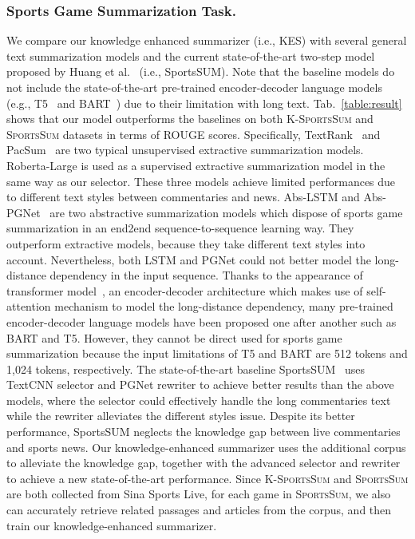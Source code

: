 \subsubsection{Sports Game Summarization Task.}
We compare our knowledge enhanced summarizer (i.e., KES) with several general text summarization models and the current state-of-the-art two-step model proposed by Huang et al.~\cite{Huang2020GeneratingSN} (i.e., SportsSUM). 
Note that the baseline models do not include the state-of-the-art pre-trained encoder-decoder language models (e.g., T5~\cite{Raffel2020ExploringTL} and BART~\cite{Lewis2020BARTDS}) due to their limitation with long text.
Tab.~\ref{table:result} shows that our model outperforms the baselines on both \textsc{K-SportsSum} and \textsc{SportsSum} datasets in terms of ROUGE scores.
Specifically, TextRank~\cite{Mihalcea2004TextRankBO} and PacSum~\cite{zheng-lapata-2019-sentence} are two typical unsupervised extractive summarization models. Roberta-Large is used as a supervised  extractive summarization model in the same way as our selector. These three models achieve limited performances due to different text styles between commentaries and news. Abs-LSTM and Abs-PGNet~\cite{See2017GetTT} are two abstractive summarization models which dispose of sports game summarization in an end2end sequence-to-sequence learning way. They outperform extractive models, because they take different text styles into account. Nevertheless, both LSTM and PGNet could not better model the long-distance dependency in the input sequence. Thanks to the appearance of transformer model~\cite{Vaswani2017AttentionIA}, an encoder-decoder architecture which makes use of self-attention mechanism to model the long-distance dependency, many pre-trained encoder-decoder language models have been proposed one after another such as BART and T5. However, they cannot be direct used for sports game summarization because the input limitations of T5 and BART are 512 tokens and 1,024 tokens, respectively.
The state-of-the-art baseline SportsSUM~\cite{Huang2020GeneratingSN} uses TextCNN selector and PGNet rewriter to achieve better results than the above models, where the selector could effectively handle the long commentaries text while the rewriter alleviates the different styles issue.
Despite its better performance, SportsSUM neglects the knowledge gap between live commentaries and sports news.
Our knowledge-enhanced summarizer uses the additional corpus to alleviate the knowledge gap, together with the advanced selector and rewriter to achieve a new state-of-the-art performance. Since \textsc{K-SportsSum} and \textsc{SportsSum} are both collected from Sina Sports Live, for each game in \textsc{SportsSum}, we also can accurately retrieve related passages and articles from the corpus, and then train our knowledge-enhanced summarizer.

